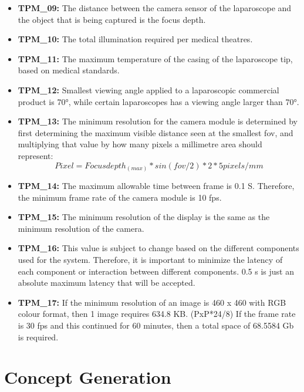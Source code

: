 \begin{itemize}
    \item\textbf{TPM\_09:} The distance between the camera sensor of the laparoscope and the object that is being captured is the focus depth. 

    \item\textbf{TPM\_10:} The total illumination required per medical theatres.
    
    \item\textbf{TPM\_11:} The maximum temperature of the casing of the laparoscope tip, based on medical standards.

    \item\textbf{TPM\_12:} Smallest viewing angle applied to a laparoscopic commercial product is 70°,  while certain laparoscopes has a viewing angle larger than 70°.

    \item\textbf{TPM\_13:} The minimum resolution for the camera module is determined by first determining the maximum visible distance seen at the smallest fov, and multiplying that value by how many pixels a millimetre area should represent: 
    \begin{equation}
        Pixel = Focus depth_(max)*sin(fov/2)*2*5 pixels/mm
    \end{equation}

    \item\textbf{TPM\_14:} The maximum allowable time between frame is 0.1 S. Therefore, the minimum frame rate of the camera module is 10 fps.

    \item\textbf{TPM\_15:} The minimum resolution of the display is the same as the minimum resolution of the camera.

    \item\textbf{TPM\_16:} This value is subject to change based on the different components used for the system. Therefore, it is important to minimize the latency of each component or interaction between different components. 0.5 s is just an absolute maximum latency that will be accepted.

    \item\textbf{TPM\_17:} If the minimum resolution of an image is 460 x 460 with RGB colour format, then 1 image requires 634.8 KB. (PxP*24/8) If the frame rate is 30 fps and this continued for 60 minutes, then a total space of 68.5584 Gb is required.

\end{itemize}

\section{Concept Generation}


